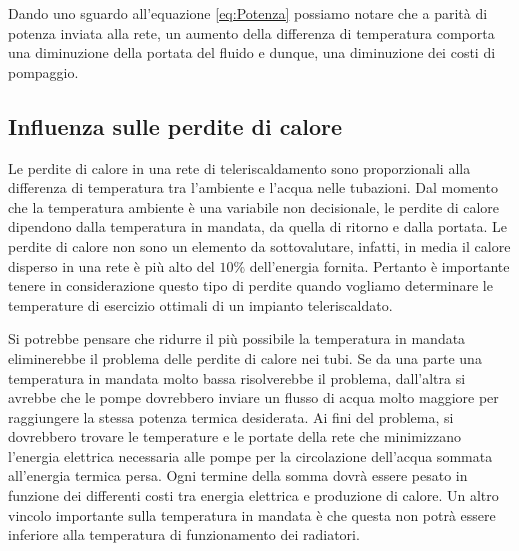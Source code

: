 \documentclass[laurea,oneside,11pt]{USiena_tesiLM}
\begin{document}
Dando uno sguardo all'equazione \ref{eq:Potenza} possiamo notare che a parità di potenza inviata alla rete, un aumento della differenza di temperatura comporta una diminuzione della portata del fluido e dunque, una diminuzione dei costi di pompaggio.


\subsection{Influenza sulle perdite di calore}
Le perdite di calore in una rete di teleriscaldamento sono proporzionali alla differenza di temperatura tra l'ambiente e l'acqua nelle tubazioni. Dal momento che la temperatura ambiente è una variabile non decisionale, le perdite di calore dipendono dalla temperatura in mandata, da quella di ritorno e dalla portata. Le perdite di calore non sono un elemento da sottovalutare, infatti, in media il calore disperso in una rete è più alto del $10\%$ dell'energia fornita. Pertanto è importante tenere in considerazione questo tipo di perdite quando vogliamo determinare le temperature di esercizio ottimali di un impianto teleriscaldato.

Si potrebbe pensare che ridurre il più possibile la temperatura in mandata eliminerebbe il problema delle perdite di calore nei tubi. Se da una parte una temperatura in mandata molto bassa risolverebbe il problema, dall'altra si avrebbe che le pompe dovrebbero inviare un flusso di acqua molto maggiore per raggiungere la stessa potenza termica desiderata. Ai fini del problema, si dovrebbero trovare le temperature e le portate  della rete che minimizzano l'energia elettrica necessaria alle pompe per la circolazione dell'acqua sommata all'energia termica persa. Ogni termine della somma dovrà essere pesato 
in funzione dei differenti costi tra energia elettrica e produzione di calore.
Un altro vincolo importante sulla temperatura in mandata è che questa non potrà essere inferiore alla temperatura di funzionamento dei radiatori.  
\end{document}
